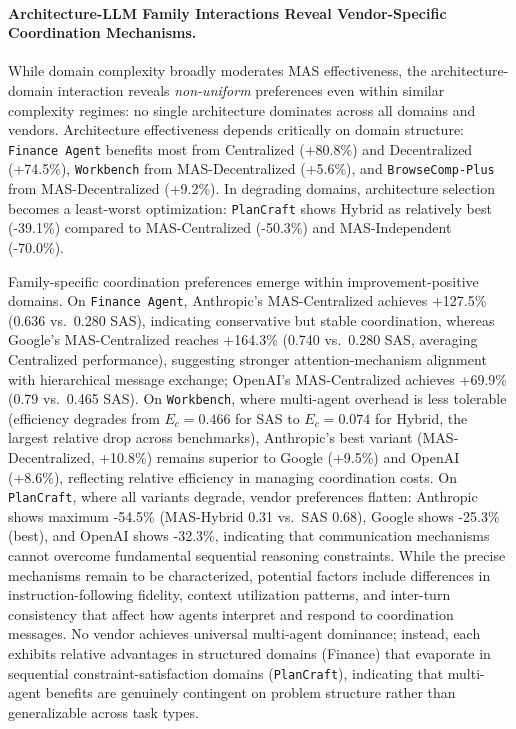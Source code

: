 \paragraph{Architecture-LLM Family Interactions Reveal Vendor-Specific Coordination Mechanisms.}
While domain complexity broadly moderates MAS effectiveness, the architecture-domain interaction reveals \emph{non-uniform} preferences even within similar complexity regimes: no single architecture dominates across all domains and vendors. Architecture effectiveness depends critically on domain structure: \texttt{Finance Agent} benefits most from Centralized (+80.8\%) and Decentralized (+74.5\%), \texttt{Workbench} from MAS-Decentralized (+5.6\%), and \texttt{BrowseComp-Plus} from MAS-Decentralized (+9.2\%). In degrading domains, architecture selection becomes a least-worst optimization: \texttt{PlanCraft} shows Hybrid as relatively best (-39.1\%) compared to MAS-Centralized (-50.3\%) and MAS-Independent (-70.0\%).
  
Family-specific coordination preferences emerge within improvement-positive domains. On \texttt{Finance Agent}, Anthropic's MAS-Centralized achieves +127.5\% (0.636 vs.\ 0.280 SAS), indicating conservative but stable coordination, whereas Google's MAS-Centralized reaches +164.3\% (0.740 vs.\ 0.280 SAS, averaging Centralized performance), suggesting stronger attention-mechanism alignment with hierarchical message exchange; OpenAI's MAS-Centralized achieves +69.9\% (0.79 vs.\ 0.465 SAS). On \texttt{Workbench}, where multi-agent overhead is less tolerable (efficiency degrades from $E_c = 0.466$ for SAS to $E_c = 0.074$ for Hybrid, the largest relative drop across benchmarks), Anthropic's best variant (MAS-Decentralized, +10.8\%) remains superior to Google (+9.5\%) and OpenAI (+8.6\%), reflecting relative efficiency in managing coordination costs. On \texttt{PlanCraft}, where all variants degrade, vendor preferences flatten: Anthropic shows maximum -54.5\% (MAS-Hybrid 0.31 vs.\ SAS 0.68), Google shows -25.3\% (best), and OpenAI shows -32.3\%, indicating that communication mechanisms cannot overcome fundamental sequential reasoning constraints.  While the precise mechanisms remain to be characterized, potential factors include differences in instruction-following fidelity, context utilization patterns, and inter-turn consistency that affect how agents interpret and respond to coordination messages. No vendor achieves universal multi-agent dominance; instead, each exhibits relative advantages in structured domains (Finance) that evaporate in sequential constraint-satisfaction domains (\texttt{PlanCraft}), indicating that multi-agent benefits are genuinely contingent on problem structure rather than generalizable across task types.
  

